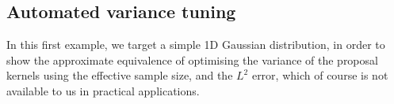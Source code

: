 \documentclass[final]{siamltex}
\newcommand{\revised}{}
\begin{document}





\subsection{Automated variance tuning}
\label{sec:problem 1}
{\revised In this first example, we target a simple 1D Gaussian distribution, in
order to show the approximate equivalence of optimising the variance
of the proposal kernels using the effective sample size, and the $L^2$
error, which of course is not available to us in practical
applications.}
\end{document}

